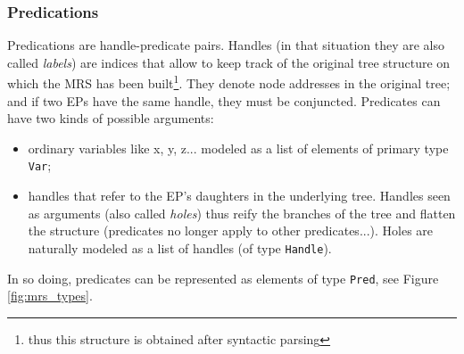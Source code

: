 \documentclass[11pt]{article}
\begin{document}
			\subsubsection{Predications}
				Predications are handle-predicate pairs. Handles (in that situation they are also called \textit{labels}) are indices that allow to keep track of the original tree structure on which the MRS has been built\footnote{thus this structure is obtained after syntactic parsing}. They denote node addresses in the original tree; and if two EPs have the same handle, they must be conjuncted. Predicates can have two kinds of possible arguments:
				\begin{itemize}
					\item ordinary variables like x, y, z... modeled as a list of elements of primary type \texttt{Var}; \vspace{-2mm}
					\item handles that refer to the EP's daughters in the underlying tree. Handles seen as arguments (also called \textit{holes}) thus reify the branches of the tree and flatten the structure (predicates no longer apply to other predicates...). Holes are naturally modeled as a list of handles (of type \texttt{Handle}).
				\end{itemize}
				In so doing, predicates can be represented as elements of type \texttt{Pred}, see Figure \ref{fig:mrs_types}.
\end{document}
